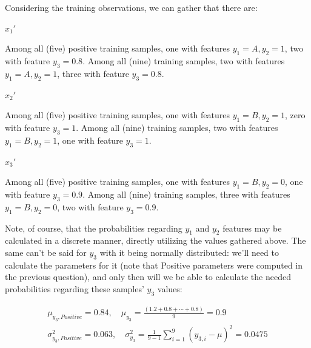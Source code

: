 \documentclass[12pt]{article}
\begin{document}
\begin{enumerate}[leftmargin=\labelsep]
        Considering the training observations, we can gather that there are:

        \begin{multicols}{3}
          \setlength{\columnseprule}{1pt}
          \def\columnseprulecolor{\color{black}}
          \centering

          $x_1'$

          Among all (five) positive training samples, one with features $y_1 = A, y_2 = 1$,
          two with feature $y_3 = 0.8$.
          Among all (nine) training samples, two with features $y_1 = A, y_2 = 1$, three
          with feature $y_3 = 0.8$.

          \columnbreak

          $x_2'$

          Among all (five) positive training samples, one with features $y_1 = B, y_2 = 1$,
          zero with feature $y_3 = 1$.
          Among all (nine) training samples, two with features $y_1 = B, y_2 = 1$, one
          with feature $y_3 = 1$.

          \columnbreak

          $x_3'$

          Among all (five) positive training samples, one with features $y_1 = B, y_2 = 0$,
          one with feature $y_3 = 0.9$.
          Among all (nine) training samples, three with features $y_1 = B, y_2 = 0$,
          two with feature $y_3 = 0.9$.

        \end{multicols}

        Note, of course, that the probabilities regarding $y_1$ and $y_2$ features may
        be calculated in a discrete manner, directly utilizing the values gathered above.
        The same can't be said for $y_3$ with it being normally distributed:
        we'll need to calculate the parameters for it (note that Positive parameters were computed in the
        previous question), and only then will we be able to calculate the needed probabilities regarding
        these samples' $y_3$ values:

        \begin{align}
          \mu_{y_3, Positive} = 0.84, \quad \mu_{y_3} = \frac{(1.2 + 0.8 + \cdots + 0.8)}{9} = 0.9 \\
          \sigma_{y_3, Positive}^2 = 0.063, \quad \sigma_{y_3}^2 = \frac{1}{9 - 1} \sum_{i=1}^{9} (y_{3, i} - \mu)^2 = 0.0475
        \end{align}


\end{enumerate}
\end{document}
